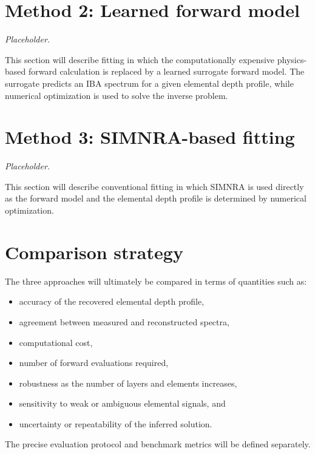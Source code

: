 \documentclass[11pt,a4paper]{article}
\begin{document}
\section{Method 2: Learned forward model}

\textit{Placeholder.}

This section will describe fitting in which the computationally expensive physics-based forward calculation is replaced by a learned surrogate forward model. The surrogate predicts an IBA spectrum for a given elemental depth profile, while numerical optimization is used to solve the inverse problem.

\section{Method 3: SIMNRA-based fitting}

\textit{Placeholder.}

This section will describe conventional fitting in which SIMNRA is used directly as the forward model and the elemental depth profile is determined by numerical optimization.

\section{Comparison strategy}

The three approaches will ultimately be compared in terms of quantities such as:
\begin{itemize}
    \item accuracy of the recovered elemental depth profile,
    \item agreement between measured and reconstructed spectra,
    \item computational cost,
    \item number of forward evaluations required,
    \item robustness as the number of layers and elements increases,
    \item sensitivity to weak or ambiguous elemental signals, and
    \item uncertainty or repeatability of the inferred solution.
\end{itemize}

The precise evaluation protocol and benchmark metrics will be defined separately.
\end{document}
